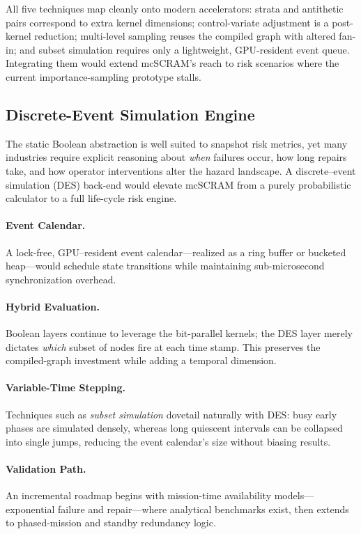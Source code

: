All five techniques map cleanly onto modern accelerators: strata and antithetic pairs correspond to extra kernel dimensions; control-variate adjustment is a post-kernel reduction; multi-level sampling reuses the compiled graph with altered fan-in; and subset simulation requires only a lightweight, GPU-resident event queue.  Integrating them would extend mcSCRAM’s reach to risk scenarios where the current importance-sampling prototype stalls.

\subsection{Discrete-Event Simulation Engine}
The static Boolean abstraction is well suited to snapshot risk metrics, yet many
industries require explicit reasoning about \emph{when} failures occur, how long
repairs take, and how operator interventions alter the hazard landscape.  A
discrete–event simulation (DES) back-end would elevate mcSCRAM from a purely
probabilistic calculator to a full life-cycle risk engine.

\paragraph*{Event Calendar.}  A lock-free, GPU–resident event calendar—realized
as a ring buffer or bucketed heap—would schedule state transitions while
maintaining sub-microsecond synchronization overhead.

\paragraph*{Hybrid Evaluation.}  Boolean layers continue to leverage the
bit-parallel kernels; the DES layer merely dictates \emph{which} subset of
nodes fire at each time stamp.  This preserves the compiled-graph investment
while adding a temporal dimension.

\paragraph*{Variable-Time Stepping.}  Techniques such as \emph{subset
simulation} dovetail naturally with DES: busy early phases are simulated
densely, whereas long quiescent intervals can be collapsed into single jumps,
reducing the event calendar’s size without biasing results.

\paragraph*{Validation Path.}  An incremental roadmap begins with mission-time
availability models—exponential failure and repair—where analytical
benchmarks exist, then extends to phased-mission and standby redundancy logic.

